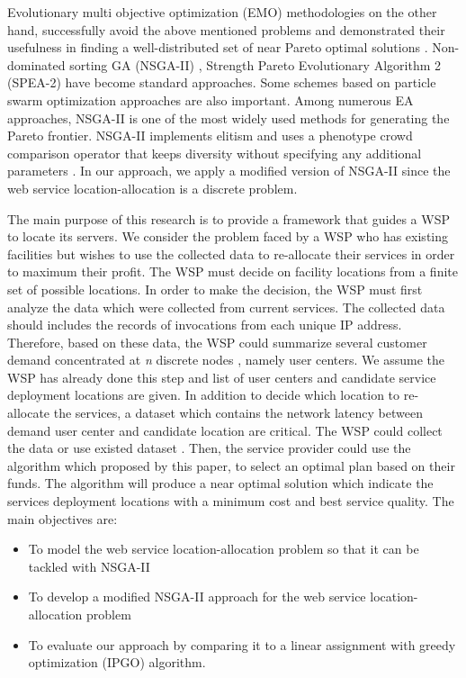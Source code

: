 \documentclass{llncs}
\begin{document}
Evolutionary multi objective optimization (EMO) methodologies on the other hand, successfully avoid the above mentioned problems and demonstrated their usefulness in finding a well-distributed set of near Pareto optimal solutions \cite{Aboolian}. Non-dominated sorting GA (NSGA-II) \cite{996017}, Strength Pareto Evolutionary Algorithm 2 (SPEA-2) \cite{Deb} have become standard approaches. 
Some schemes based on particle swarm optimization approaches \cite{Elhossini} \cite{Huang} are also important. 
Among numerous EA approaches, NSGA-II is one of the most widely used methods for generating the Pareto frontier. 
NSGA-II implements elitism and uses a phenotype crowd comparison operator that keeps diversity without specifying any additional parameters \cite{Deb06referencepoint}.
In our approach, we apply a modified version of NSGA-II since the web service location-allocation is a discrete problem. 

The main purpose of this research is to provide a framework that guides a WSP to locate its servers.
We consider the problem faced by a WSP who has existing facilities but wishes to use the collected data to re-allocate their services in order to maximum their profit.
The WSP must decide on facility locations from a finite set of possible locations. 
In order to make the decision, the WSP must first analyze the data which were collected from current services. 
The collected data should includes the records of invocations from each unique IP address.
Therefore, based on these data, the WSP could summarize several customer demand concentrated at \textit{n} discrete nodes \cite{Aboolian}, namely user centers. 
We assume the WSP has already done this step and list of user centers and candidate service deployment locations are given.
In addition to decide which location to re-allocate the services, a dataset which contains the network latency between demand user center and candidate location are critical. 
The WSP could collect the data or use existed dataset  \cite{6076756} \cite{5552800}. 
Then, the service provider could use the algorithm which proposed by this paper, to select an optimal plan based on their funds. 
The algorithm will produce a near optimal solution which indicate the services deployment locations with a minimum cost and best service quality.
The main objectives are:
\begin{itemize}
	\item To model the web service location-allocation problem so that it can be tackled with NSGA-II
	\item To develop a modified NSGA-II approach for the web service location-allocation problem
	\item To evaluate our approach by comparing it to a linear assignment with greedy optimization (IPGO) algorithm.
\end{itemize}
\end{document}
